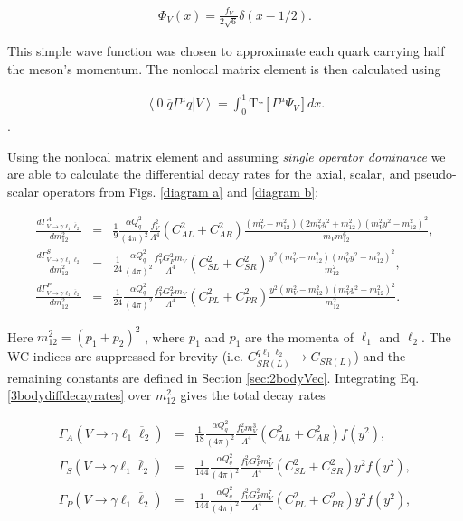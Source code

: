 \documentclass[12pt]{article}
\newcommand{\braket}[2]{\left\langle #1 | #2 \right\rangle}
\begin{document}
\begin{eqnarray}\label{distributionfunction}
\Phi_V(x) = \frac{f_V}{2\sqrt{6}}  \delta(x-1/2).
\end{eqnarray}

This simple wave function was chosen to approximate each quark carrying half the meson's momentum.  The nonlocal matrix element is then calculated using 

\begin{eqnarray}
\braket{0|\overline q \Gamma^{\mu} q}V =\int_{0}^{1} \text{Tr}[\Gamma^{\mu} \Psi_V] dx  \label{matrixelement}.
\end{eqnarray}.

Using the nonlocal matrix element and assuming \textit{single operator dominance} we are able to calculate the differential decay rates for the axial, scalar, and pseudo-scalar operators from Figs. \ref{diagram a} and \ref{diagram b}:

\begin{eqnarray} \label{3bodydiffdecayrates}
%
\frac{d\Gamma_{V \to \gamma \ell_1 \overline \ell_2}^A}{dm_{12}^2} &=& \frac{1}{9} \frac{\alpha Q_q^2}{\left(4 \pi\right)^2} 
\frac{f_V^2}{\Lambda^4} \left(C_{AL}^2+C_{AR}^2 \right) \frac{\left(m_V^2-m_{12}^2\right) 
\left(2 m_V^2 y^2 + m_{12}^2\right) \left(m_V^2 y^2 - m_{12}^2\right)^2}{m_V m_{12}^6}, 
\nonumber \\
%
\frac{d\Gamma_{V \to \gamma \ell_1 \overline \ell_2}^S}{dm_{12}^2} &=& \frac{1}{24} 
\frac{\alpha Q_q^2}{\left(4 \pi\right)^2} \frac{f_V^2 G_F^2 m_V}{\Lambda^4} 
\left(C_{SL}^2+C_{SR}^2 \right) \frac{y^2 \left(m_V^2-m_{12}^2\right) 
\left(m_V^2 y^2 - m_{12}^2\right)^2}{m_{12}^2}, 
\\
%
\frac{d\Gamma_{V \to \gamma \ell_1 \overline \ell_2}^P}{dm_{12}^2} &=& \frac{1}{24} 
\frac{\alpha Q_q^2}{\left(4 \pi\right)^2} \frac{f_V^2 G_F^2 m_V}{\Lambda^4} 
\left(C_{PL}^2+C_{PR}^2 \right) \frac{y^2 \left(m_V^2-m_{12}^2\right) 
\left(m_V^2 y^2 - m_{12}^2\right)^2}{m_{12}^2}.
\nonumber
\end{eqnarray}

Here $m_{12}^2 = (p_1+p_2)^2$ \cite{PDG}, where $p_{1}$ and $p_{1}$ are the momenta of $\ell_1$ and $\ell_2$.  The WC indices are suppressed for brevity (i.e. $C_{SR(L)}^{q \ell_1 \ell_2} \to C_{SR(L)}$) and the remaining constants are defined in Section \ref{sec:2bodyVec}.  Integrating Eq. \ref{3bodydiffdecayrates} over $m_{12}^2$ gives the total decay rates

\begin{eqnarray} \label{3bodydecayrate}
\Gamma_A (V \to \gamma \ell_1 \overline \ell_2) &=& \frac{1}{18} \frac{\alpha Q_q^2}{\left(4 \pi\right)^2} 
\frac{f_V^2 m_V^3}{\Lambda^4} \left(C_{AL}^2+C_{AR}^2 \right) f(y^2), 
\nonumber \\
%
\Gamma_S(V \to \gamma \ell_1 \overline \ell_2) &=& \frac{1}{144} \frac{\alpha Q_q^2}{\left(4 \pi\right)^2} 
\frac{f_V^2 G_F^2 m_V^7}{\Lambda^4} \left(C_{SL}^2+C_{SR}^2 \right) y^2 f(y^2), 
\\
%
\Gamma_P (V \to \gamma \ell_1 \overline \ell_2) &=& \frac{1}{144} \frac{\alpha Q_q^2}{\left(4 \pi\right)^2} 
\frac{f_V^2 G_F^2 m_V^7}{\Lambda^4} \left(C_{PL}^2+C_{PR}^2 \right) y^2 f(y^2),
\nonumber
\end{eqnarray}
\end{document}
